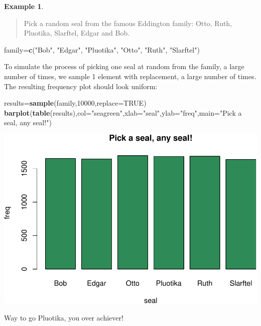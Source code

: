 \documentclass[
]{book}
\newenvironment{Shaded}{\begin{snugshade}}{\end{snugshade}}
\newcommand{\AttributeTok}[1]{\textcolor[rgb]{0.13,0.29,0.53}{#1}}
\newcommand{\ConstantTok}[1]{\textcolor[rgb]{0.56,0.35,0.01}{#1}}
\newcommand{\DecValTok}[1]{\textcolor[rgb]{0.00,0.00,0.81}{#1}}
\newcommand{\FunctionTok}[1]{\textcolor[rgb]{0.13,0.29,0.53}{\textbf{#1}}}
\newcommand{\NormalTok}[1]{#1}
\newcommand{\OtherTok}[1]{\textcolor[rgb]{0.56,0.35,0.01}{#1}}
\newcommand{\StringTok}[1]{\textcolor[rgb]{0.31,0.60,0.02}{#1}}
\theoremstyle{definition}
\theoremstyle{definition}
\newtheorem{example}{Example}[chapter]
\theoremstyle{definition}
\theoremstyle{definition}
\theoremstyle{remark}
\begin{document}
\begin{example}
\protect\hypertarget{exm:seals-uniform-R}{}\label{exm:seals-uniform-R}\leavevmode

\begin{quote}
Pick a random seal from the famous Eddington family: Otto, Ruth, Pluotika, Slarftel, Edgar and Bob.
\end{quote}

\begin{Shaded}
\begin{Highlighting}[]
\NormalTok{family}\OtherTok{=}\FunctionTok{c}\NormalTok{(}\StringTok{"Bob"}\NormalTok{, }\StringTok{"Edgar"}\NormalTok{, }\StringTok{"Pluotika"}\NormalTok{, }\StringTok{"Otto"}\NormalTok{, }\StringTok{"Ruth"}\NormalTok{, }\StringTok{"Slarftel"}\NormalTok{)}
\end{Highlighting}
\end{Shaded}

To simulate the process of picking one seal at random from the family, a large number of times, we sample 1 element with replacement, a large number of times. The resulting frequency plot should look uniform:

\begin{Shaded}
\begin{Highlighting}[]
\NormalTok{results}\OtherTok{=}\FunctionTok{sample}\NormalTok{(family,}\DecValTok{10000}\NormalTok{,}\AttributeTok{replace=}\ConstantTok{TRUE}\NormalTok{)}
\FunctionTok{barplot}\NormalTok{(}\FunctionTok{table}\NormalTok{(results),}\AttributeTok{col=}\StringTok{"seagreen"}\NormalTok{,}\AttributeTok{xlab=}\StringTok{"seal"}\NormalTok{,}\AttributeTok{ylab=}\StringTok{"freq"}\NormalTok{,}\AttributeTok{main=}\StringTok{"Pick a seal, any seal!"}\NormalTok{)}
\end{Highlighting}
\end{Shaded}

\includegraphics{math340-notes_files/figure-latex/unnamed-chunk-138-1.pdf}

Way to go Pluotika, you over achiever!

\end{example}
\end{document}
